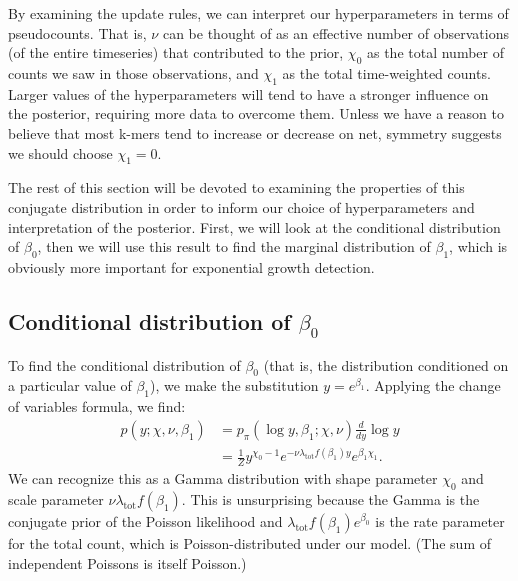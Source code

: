 \documentclass[12pt, letterpaper]{article}
\newcommand{ \lambtot }{\lambda_{\text{tot}}}
\begin{document}
By examining the update rules, we can interpret our hyperparameters in terms of pseudocounts.
That is, $\nu$ can be thought of as an effective number of observations (of the entire timeseries) that contributed to the prior, $\chi_0$ as the total number of counts we saw in those observations, and $\chi_1$ as the total time-weighted counts.
Larger values of the hyperparameters will tend to have a stronger influence on the posterior, requiring more data to overcome them.
Unless we have a reason to believe that most k-mers tend to increase or decrease on net, symmetry suggests we should choose $\chi_1 = 0$.

The rest of this section will be devoted to examining the properties of this conjugate distribution in order to inform our choice of hyperparameters and interpretation of the posterior.
First, we will look at the conditional distribution of $\beta_0$, then we will use this result to find the marginal distribution of $\beta_1$, which is obviously more important for exponential growth detection.

\subsection{Conditional distribution of $\beta_0$}

To find the conditional distribution of $\beta_0$ (that is, the distribution conditioned on a particular value of $\beta_1$), we make the substitution $y = e^{\beta_1}$.
Applying the change of variables formula, we find:
\begin{align}
    p(y; \chi, \nu, \beta_1) & = p_\pi(\log y, \beta_1; \chi, \nu) \frac{d}{dy} \log y \\
                             &= \frac{1}{Z} y^{\chi_0 - 1} e^{-\nu \lambtot f(\beta_1) y} e^{\beta_1 \chi_1}.
                             \label{eq:conditional}
\end{align}
We can recognize this as a Gamma distribution with shape parameter $\chi_0$ and scale parameter $\nu \lambtot f(\beta_1)$.
This is unsurprising because the Gamma is the conjugate prior of the Poisson likelihood and $\lambtot f(\beta_1) e^{\beta_0}$ is the rate parameter for the total count, which is Poisson-distributed under our model.
(The sum of independent Poissons is itself Poisson.)
\end{document}
